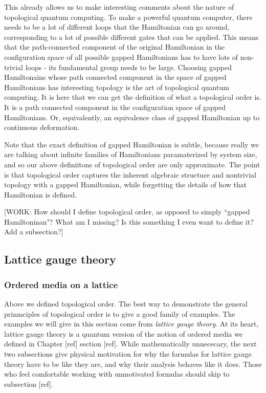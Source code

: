 \documentclass{article}
\theoremstyle{definition}
\newcommand{\0}{\left|0\right>}
\newcommand{\1}{\left|1\right>}
\numberwithin{figure}{section}
\begin{document}
This already allows us to make interesting comments about the nature of topological quantum computing. To make a powerful quantum computer, there needs to be a lot of different loops that the Hamiltonian can go around, corresponding to a lot of possible different gates that can be applied. This means that the path-connected component of the original Hamiltonian in the configuration space of all possible gapped Hamiltonians has to have lots of non-trivial loops - its fundamental group needs to be large. Choosing gapped Hamiltonains whose path connected component in the space of gapped Hamiltonians has interesting topology is the art of topological quantum computing. It is here that we can get the definition of what a topological order is. It is a path connected component in the configuration space of gapped Hamiltonians. Or, equivalently, an equivalence class of gapped Hamiltonian up to continuous deformation.

Note that the exact definition of gapped Hamiltonian is subtle, because really we are talking about infinite families of Hamiltonians paramaterized by system size, and so our above definiitons of topological order are only approximate. The point is that topological order captures the inherent algebraic structure and nontrivial topology with a gapped Hamiltonian, while forgetting the details of how that Hamiltonian is defined.

[WORK: How should I define topological order, as opposed to simply ``gapped Hamiltoninan"? What am I missing? Is this something I even want to define it? Add a subsection?]

\subsection{Lattice gauge theory}

\subsubsection{Ordered media on a lattice}

Above we defined topological order. The best way to demonstrate the general prinmciples of topological order is to give a good family of examples. The examples we will give in this section come from \textit{lattice gauge theory}. At its heart, lattice gauge theory is a quantum version of the notion of ordered media we defined in Chapter [ref] section [ref]. While mathematically unnececary, the next two subsections give physical motivation for why the formulas for lattice gauge theory have to be like they are, and why their analysis behaves like it does. Those who feel comfortable working with unmotivated formulas should skip to subsection [ref].
\end{document}
